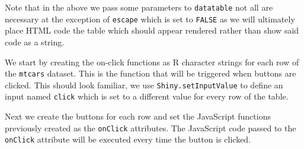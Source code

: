 \documentclass[
]{krantz}
\makeatletter
\newenvironment{Shaded}{\begin{snugshade}}{\end{snugshade}}
\newcommand{\ControlFlowTok}[1]{\textcolor[rgb]{0.27,0.27,0.27}{\textbf{#1}}}
\newcommand{\DataTypeTok}[1]{\textcolor[rgb]{0.27,0.27,0.27}{#1}}
\newcommand{\KeywordTok}[1]{\textcolor[rgb]{0.27,0.27,0.27}{\textbf{#1}}}
\newcommand{\NormalTok}[1]{#1}
\newcommand{\OperatorTok}[1]{\textcolor[rgb]{0.43,0.43,0.43}{\textbf{#1}}}
\newcommand{\OtherTok}[1]{\textcolor[rgb]{0.37,0.37,0.37}{#1}}
\newcommand{\StringTok}[1]{\textcolor[rgb]{0.5,0.5,0.5}{#1}}
\newenvironment{kframe}{%
\medskip{}
\setlength{\fboxsep}{.8em}
 \def\at@end@of@kframe{}%
 \ifinner\ifhmode%
  \def\at@end@of@kframe{\end{minipage}}%
  \begin{minipage}{\columnwidth}%
 \fi\fi%
 \def\FrameCommand##1{\hskip\@totalleftmargin \hskip-\fboxsep
 \colorbox{shadecolor}{##1}\hskip-\fboxsep
     \hskip-\linewidth \hskip-\@totalleftmargin \hskip\columnwidth}%
 \MakeFramed {\advance\hsize-\width
   \@totalleftmargin\z@ \linewidth\hsize
   \@setminipage}}%
 {\par\unskip\endMakeFramed%
 \at@end@of@kframe}
\renewenvironment{Shaded}{\begin{kframe}}{\end{kframe}}
\makeatother
\begin{document}
Note that in the above we pass some parameters to \texttt{datatable} not all are necessary at the exception of \texttt{escape} which is set to \texttt{FALSE} as we will ultimately place HTML code the table which should appear rendered rather than show said code as a string.

We start by creating the on-click functions as R character strings for each row of the \texttt{mtcars} dataset. This is the function that will be triggered when buttons are clicked. This should look familiar, we use \texttt{Shiny.setInputValue} to define an input named \texttt{click} which is set to a different value for every row of the table.

\begin{Shaded}
\end{Shaded}

Next we create the buttons for each row and set the JavaScript functions previously created as the \texttt{onClick} attributes. The JavaScript code passed to the \texttt{onClick} attribute will be executed every time the button is clicked.
\end{document}
